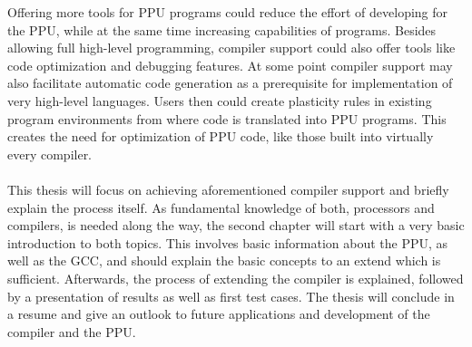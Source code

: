 Offering more tools for \ac{PPU} programs could reduce the effort of developing for the \ac{PPU}, while at the same time increasing capabilities of programs.
Besides allowing full high-level programming, compiler support could also offer tools like code optimization and debugging features.
At some point compiler support may also facilitate automatic code generation as a prerequisite for implementation of very high-level languages.
Users then could create plasticity rules in existing program environments from where code is translated into \ac{PPU} programs.
This creates the need for optimization of \ac{PPU} code, like those built into virtually every compiler.
\\
\\
This thesis will focus on achieving aforementioned compiler support and briefly explain the process itself.
As fundamental knowledge of both, processors and compilers, is needed along the way, the second chapter will start with a very basic introduction to both topics.
This involves basic information about the \ac{PPU}, as well as the \ac{GCC}, and should explain the basic concepts to an extend which is sufficient.
Afterwards, the process of extending the compiler is explained, followed by a presentation of results as well as first test cases.
The thesis will conclude in a resume and give an outlook to future applications and development of the compiler and the \ac{PPU}.
